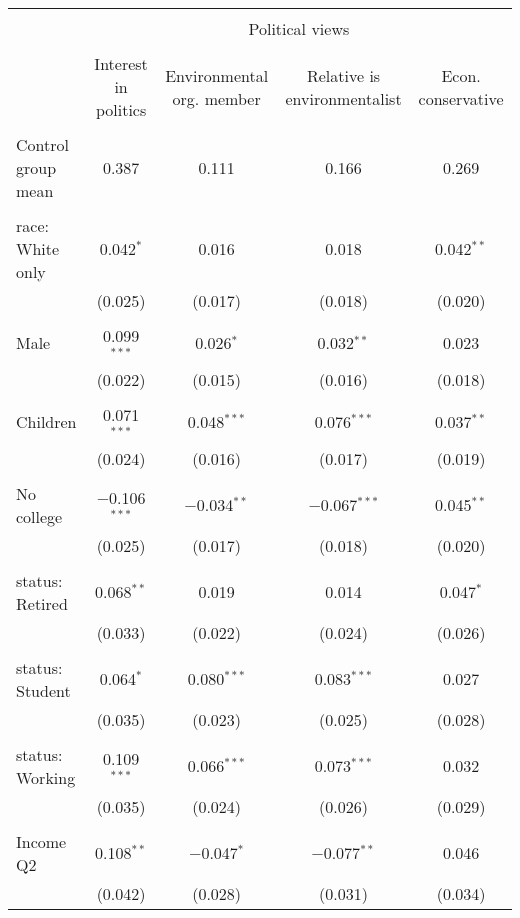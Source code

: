 
\begin{tabular}{@{\extracolsep{5pt}}lcccc} 
\\[-1.8ex]\hline 
\hline \\[-1.8ex] 
 & \multicolumn{4}{c}{Political views} \\ 
\cline{2-5} 
\\[-1.8ex] & Interest in politics & Environmental org. member & Relative is environmentalist & Econ. conservative \\ 
\hline \\[-1.8ex] 
 Control group mean & 0.387 & 0.111 & 0.166 & 0.269  \\ \hline \\[-1.8ex] race: White only & 0.042$^{*}$ & 0.016 & 0.018 & 0.042$^{**}$ \\ 
  & (0.025) & (0.017) & (0.018) & (0.020) \\ 
  & & & & \\ 
 Male & 0.099$^{***}$ & 0.026$^{*}$ & 0.032$^{**}$ & 0.023 \\ 
  & (0.022) & (0.015) & (0.016) & (0.018) \\ 
  & & & & \\ 
 Children & 0.071$^{***}$ & 0.048$^{***}$ & 0.076$^{***}$ & 0.037$^{**}$ \\ 
  & (0.024) & (0.016) & (0.017) & (0.019) \\ 
  & & & & \\ 
 No college & $-$0.106$^{***}$ & $-$0.034$^{**}$ & $-$0.067$^{***}$ & 0.045$^{**}$ \\ 
  & (0.025) & (0.017) & (0.018) & (0.020) \\ 
  & & & & \\ 
 status: Retired & 0.068$^{**}$ & 0.019 & 0.014 & 0.047$^{*}$ \\ 
  & (0.033) & (0.022) & (0.024) & (0.026) \\ 
  & & & & \\ 
 status: Student & 0.064$^{*}$ & 0.080$^{***}$ & 0.083$^{***}$ & 0.027 \\ 
  & (0.035) & (0.023) & (0.025) & (0.028) \\ 
  & & & & \\ 
 status: Working & 0.109$^{***}$ & 0.066$^{***}$ & 0.073$^{***}$ & 0.032 \\ 
  & (0.035) & (0.024) & (0.026) & (0.029) \\ 
  & & & & \\ 
 Income Q2 & 0.108$^{**}$ & $-$0.047$^{*}$ & $-$0.077$^{**}$ & 0.046 \\ 
  & (0.042) & (0.028) & (0.031) & (0.034) \\ 

\end{tabular}
